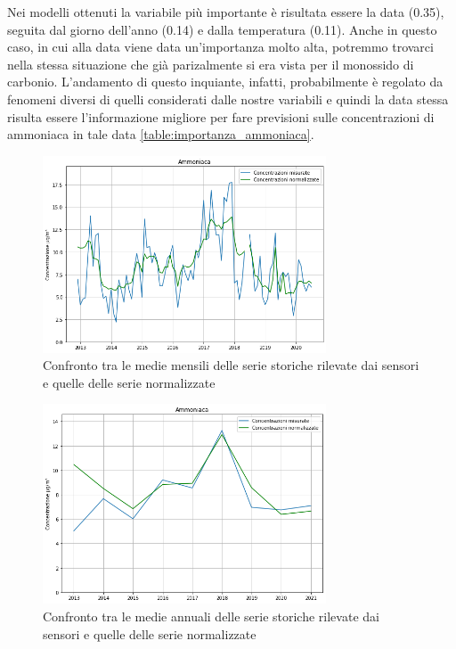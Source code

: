 \documentclass[a4paper,12pt]{report}
\begin{document}
Nei modelli ottenuti la variabile più importante è risultata essere la data (0.35), seguita dal giorno dell'anno (0.14) e dalla temperatura (0.11). Anche in questo caso, in cui alla data viene data un'importanza molto alta, potremmo trovarci nella stessa situazione che già parizalmente si era vista per il monossido di carbonio. L'andamento di questo inquiante, infatti, probabilmente è regolato da fenomeni diversi di quelli considerati dalle nostre variabili e quindi la data stessa risulta essere l'informazione migliore per fare previsioni sulle concentrazioni di ammoniaca in tale data \ref{table:importanza_ammoniaca}.

\begin{figure}[h]
\centering
\includegraphics[width=0.75\textwidth]{ammoniaca_medie_mensili}
\caption{Confronto tra le medie mensili delle serie storiche rilevate dai sensori e quelle delle serie normalizzate}
\label{fig:ammoniaca_medie_mensili}
\end{figure}

\begin{figure}[h]
\centering
\includegraphics[width=0.75\textwidth]{ammoniaca_medie_annuali}
\caption{Confronto tra le medie annuali delle serie storiche rilevate dai sensori e quelle delle serie normalizzate}
\label{fig:ammoniaca_medie_annuali}
\end{figure}
\end{document}
